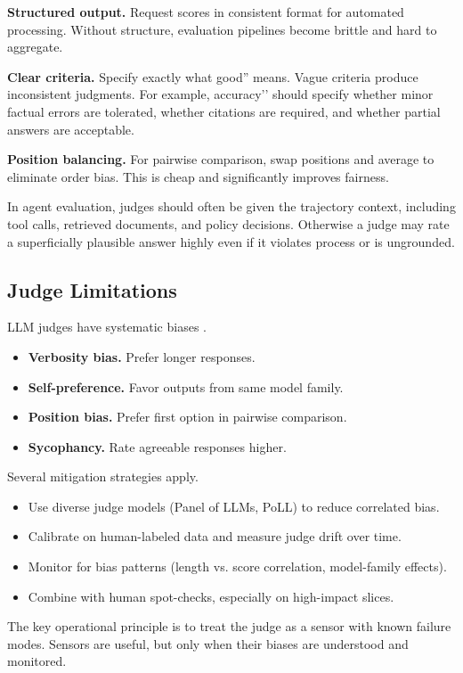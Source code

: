 \textbf{Structured output.} Request scores in consistent format for automated processing. Without structure, evaluation pipelines become brittle and hard to aggregate.

\textbf{Clear criteria.} Specify exactly what good'' means. Vague criteria produce inconsistent judgments. For example, accuracy’’ should specify whether minor factual errors are tolerated, whether citations are required, and whether partial answers are acceptable.

\textbf{Position balancing.} For pairwise comparison, swap positions and average to eliminate order bias. This is cheap and significantly improves fairness.

In agent evaluation, judges should often be given the trajectory context, including tool calls, retrieved documents, and policy decisions. Otherwise a judge may rate a superficially plausible answer highly even if it violates process or is ungrounded.

\subsection{Judge Limitations}

LLM judges have systematic biases \cite{llmasjudge2025}.
\begin{itemize}
\item \textbf{Verbosity bias.} Prefer longer responses.
\item \textbf{Self-preference.} Favor outputs from same model family.
\item \textbf{Position bias.} Prefer first option in pairwise comparison.
\item \textbf{Sycophancy.} Rate agreeable responses higher.
\end{itemize}

Several mitigation strategies apply.
\begin{itemize}
\item Use diverse judge models (Panel of LLMs, PoLL) to reduce correlated bias.
\item Calibrate on human-labeled data and measure judge drift over time.
\item Monitor for bias patterns (length vs. score correlation, model-family effects).
\item Combine with human spot-checks, especially on high-impact slices.
\end{itemize}

The key operational principle is to treat the judge as a sensor with known failure modes. Sensors are useful, but only when their biases are understood and monitored.


